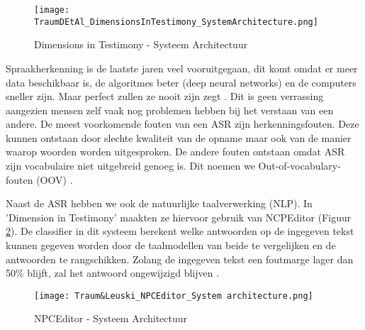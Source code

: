 \begin{figure}[h]
    \texttt{[image: TraumDEtAl\_DimensionsInTestimony\_SystemArchitecture.png]}
    \caption{Dimensions in Testimony - Systeem Architectuur \autocite{Traum2015}}
    \label{fig:DiTArchitectureVoorstel}
\end{figure}

Spraakherkenning is de laatste jaren veel vooruitgegaan, dit komt omdat er meer data beschikbaar is, de algoritmes beter (deep neural networks) en de computers sneller zijn. Maar perfect zullen ze nooit zijn zegt \textcite{Hessen2020}. Dit is geen verrassing aangezien mensen zelf vaak nog problemen hebben bij het verstaan van een andere. De meest voorkomende fouten van een ASR zijn herkenningsfouten. Deze kunnen ontstaan door slechte kwaliteit van de opname maar ook van de manier waarop woorden worden uitgesproken. De andere fouten ontstaan omdat ASR zijn vocabulaire niet uitgebreid genoeg is. Dit noemen we Out-of-vocabulary-fouten (OOV) \autocite{Hessen2020}.

Naast de ASR hebben we ook de natuurlijke taalverwerking (NLP). In 'Dimension in Testimony' maakten ze hiervoor gebruik van NCPEditor (Figuur \ref{fig:NPCEArchitectureVoorstel}). De classifier in dit systeem berekent welke antwoorden op de ingegeven tekst kunnen gegeven worden door de taalmodellen van beide te vergelijken en de antwoorden te rangschikken. Zolang de ingegeven tekst een foutmarge lager dan 50\% blijft, zal het antwoord ongewijzigd blijven \autocite{Leuski2010}.

\begin{figure}[h]
    \texttt{[image: Traum\&Leuski\_NPCEditor\_System architecture.png]}
    \caption{NPCEditor - Systeem Architectuur \autocite{Leuski2010}}
    \label{fig:NPCEArchitectureVoorstel}
\end{figure}

%
%
%
%

